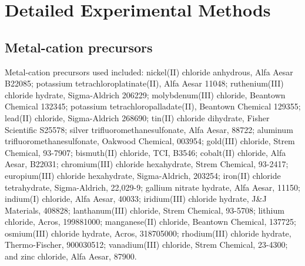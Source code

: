 

\section{Detailed Experimental Methods}
\subsection{Metal-cation precursors}
Metal-cation precursors used included: nickel(II) chloride anhydrous, Alfa Aesar B22085; potassium tetrachloroplatinate(II), Alfa Aesar 11048; ruthenium(III) chloride hydrate, Sigma-Aldrich 206229; molybdenum(III) chloride, Beantown Chemical 132345; potassium tetrachloropalladate(II), Beantown Chemical 129355; lead(II) chloride, Sigma-Aldrich 268690; tin(II) chloride dihydrate, Fisher Scientific S25578; silver trifluoromethanesulfonate, Alfa Aesar, 88722; aluminum trifluoromethanesulfonate, Oakwood Chemical, 003954; gold(III) chloride, Strem Chemical, 93-7907; bismuth(II) chloride, TCI, B3546; cobalt(II) chloride, Alfa Aesar, B22031; chromium(III) chloride hexahydrate, Strem Chemical, 93-2417; europium(III) chloride hexahydrate, Sigma-Aldrich, 203254; iron(II) chloride tetrahydrate, Sigma-Aldrich, 22,029-9; gallium nitrate hydrate, Alfa Aesar, 11150; indium(I) chloride, Alfa Aesar, 40033; iridium(III) chloride hydrate, J\&J Materials, 408828; lanthanum(III) chloride, Strem Chemical, 93-5708; lithium chloride, Acros, 199881000; manganese(II) chloride, Beantown Chemical, 137725; osmium(III) chloride hydrate, Acros, 318705000; rhodium(III) chloride hydrate, Thermo-Fischer, 900030512; vanadium(III) chloride, Strem Chemical, 23-4300; and zinc chloride, Alfa Aesar, 87900.

